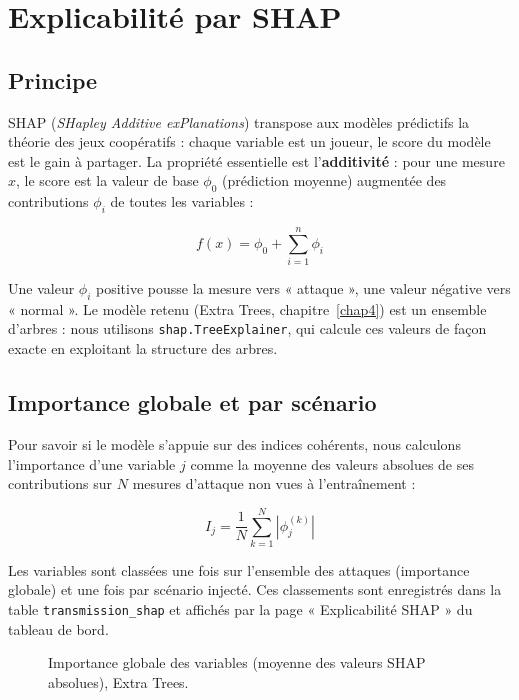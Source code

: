 \section{Explicabilité par SHAP}
\label{sec:expl_shap}

\subsection{Principe}

SHAP (\textit{SHapley Additive exPlanations}) transpose aux modèles prédictifs
la théorie des jeux coopératifs : chaque variable est un joueur, le score du
modèle est le gain à partager. La propriété essentielle est l'\textbf{additivité} :
pour une mesure $x$, le score est la valeur de base $\phi_0$ (prédiction moyenne)
augmentée des contributions $\phi_i$ de toutes les variables :

\begin{equation}
f(x) = \phi_0 + \sum_{i=1}^{n} \phi_i
\label{eq:additivite}
\end{equation}

Une valeur $\phi_i$ positive pousse la mesure vers « attaque », une valeur
négative vers « normal ». Le modèle retenu (Extra Trees, chapitre~\ref{chap4})
est un ensemble d'arbres : nous utilisons \texttt{shap.TreeExplainer}, qui
calcule ces valeurs de façon exacte en exploitant la structure des arbres.

\subsection{Importance globale et par scénario}

Pour savoir si le modèle s'appuie sur des indices cohérents, nous calculons
l'importance d'une variable $j$ comme la moyenne des valeurs absolues de ses
contributions sur $N$ mesures d'attaque non vues à l'entraînement :

\begin{equation}
I_j = \frac{1}{N}\sum_{k=1}^{N}\left|\phi_j^{(k)}\right|
\label{eq:importance}
\end{equation}

Les variables sont classées une fois sur l'ensemble des attaques (importance
globale) et une fois par scénario injecté. Ces classements sont enregistrés
dans la table \texttt{transmission\_shap} et affichés par la page
« Explicabilité SHAP » du tableau de bord.

\begin{figure}[H]
\centering
{}
\caption{Importance globale des variables (moyenne des valeurs SHAP
absolues), Extra Trees.}
\label{fig:expl_shap_global}
\end{figure}

